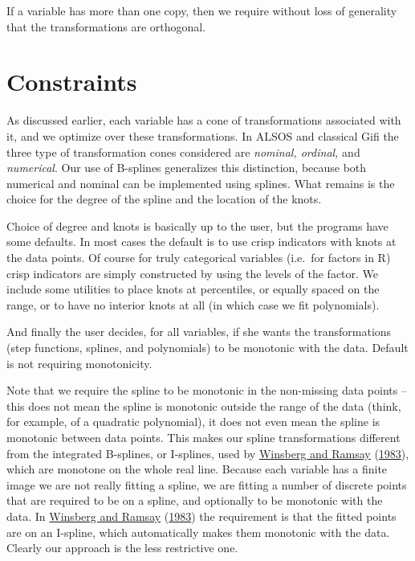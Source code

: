 \documentclass[
  12pt,
]{book}
\begin{document}
If a variable has more than one copy, then we require without loss of generality that the transformations are orthogonal.

\hypertarget{constraints}{%
\section{Constraints}\label{constraints}}

As discussed earlier, each variable has a cone of transformations associated with it, and we optimize over these transformations. In
ALSOS and classical Gifi the three type of transformation cones considered are \emph{nominal, ordinal,} and \emph{numerical}. Our use of B-splines
generalizes this distinction, because both numerical and nominal can be implemented using splines. What remains is the choice for
the degree of the spline and the location of the knots.

Choice of degree and knots is basically up to the user, but the programs have some defaults. In most cases the default is to use crisp indicators with knots at the data points. Of course for truly categorical variables (i.e.~for factors in R) crisp indicators are simply constructed by using the levels of the factor. We include some utilities to place knots at percentiles, or equally spaced on the range, or to have no interior knots at all (in which case we fit polynomials).

And finally the user decides, for all variables, if she wants the transformations (step functions, splines, and polynomials) to be monotonic with the data. Default is not requiring monotonicity.

Note that we require the spline to be monotonic in the non-missing data points -- this does not mean the spline is monotonic outside the range of the data (think, for example, of a quadratic polynomial), it does not even mean the spline is monotonic between data points. This makes our spline transformations different from the integrated B-splines, or I-splines, used by \protect\hyperlink{ref-winsberg_ramsay_83}{Winsberg and Ramsay} (\protect\hyperlink{ref-winsberg_ramsay_83}{1983}), which are monotone on the whole real line. Because each variable has a finite image we are not really fitting a spline, we are fitting a number of discrete points that are required to be on a spline, and optionally to be monotonic with the data. In \protect\hyperlink{ref-winsberg_ramsay_83}{Winsberg and Ramsay} (\protect\hyperlink{ref-winsberg_ramsay_83}{1983}) the requirement is that the fitted points are on an I-spline, which automatically makes them monotonic with the data. Clearly our approach is the less restrictive one.
\end{document}
